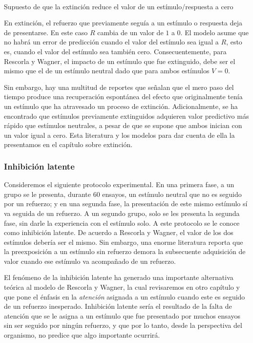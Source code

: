 \documentclass[
  letterpaper,
]{book}
\makeatletter
\let\oldparagraph\paragraph
\renewcommand{\paragraph}{
    \@ifstar
      \xxxParagraphStar
      \xxxParagraphNoStar
  }
\newcommand{\xxxParagraphStar}[1]{\oldparagraph*{#1}\mbox{}}
\newcommand{\xxxParagraphNoStar}[1]{\oldparagraph{#1}\mbox{}}
\makeatother
\begin{document}
\paragraph{Supuesto de que la extinción reduce el valor de un
estímulo/respuesta a
cero}\label{supuesto-de-que-la-extinciuxf3n-reduce-el-valor-de-un-estuxedmulorespuesta-a-cero}

En extinción, el refuerzo que previamente seguía a un estímulo o
respuesta deja de presentarse. En este caso \(R\) cambia de un valor de
\(1\) a \(0\). El modelo asume que no habrá un error de predicción
cuando el valor del estímulo sea igual a \(R\), esto es, cuando el valor
del estímulo sea también cero. Consecuentemente, para Rescorla y Wagner,
el impacto de un estímulo que fue extinguido, debe ser el mismo que el
de un estímulo neutral dado que para ambos estímulos \(V = 0\).

Sin embargo, hay una multitud de reportes que señalan que el mero paso
del tiempo produce una recuperación espontánea del efecto que
originalmente tenía un estímulo que ha atravesado un proceso de
extinción. Adicionalmente, se ha encontrado que estímulos previamente
extinguidos adquieren valor predictivo más rápido que estímulos
neutrales, a pesar de que se supone que ambos inician con un valor igual
a cero. Esta literatura y los modelos para dar cuenta de ella la
presentamos en el capítulo sobre extinción.

\subsubsection{Inhibición latente}\label{inhibiciuxf3n-latente}

Consideremos el siguiente protocolo experimental. En una primera fase, a
un grupo se le presenta, durante 60 ensayos, un estímulo neutral que no
es seguido por un refuerzo; y en una segunda fase, la presentación de
este mismo estímulo sí va seguida de un refuerzo. A un segundo grupo,
solo se les presenta la segunda fase, sin darle la experiencia con el
estímulo solo. A este protocolo se le conoce como inhibición latente. De
acuerdo a Rescorla y Wagner, el valor de los dos estímulos debería ser
el mismo. Sin embargo, una enorme literatura reporta que la
preexposición a un estímulo sin refuerzo demora la subsecuente
adquisición de valor cuando ese estímulo va acompañado de un refuerzo.

El fenómeno de la inhibición latente ha generado una importante
alternativa teórica al modelo de Rescorla y Wagner, la cual revisaremos
en otro capítulo y que pone el énfasis en la \emph{atención} asignada a
un estímulo cuando este es seguido de un refuerzo inesperado. Inhibición
latente sería el resultado de la falta de atención que se le asigna a un
estímulo que fue presentado por muchos ensayos sin ser seguido por
ningún refuerzo, y que por lo tanto, desde la perspectiva del organismo,
no predice que algo importante ocurrirá.
\end{document}
